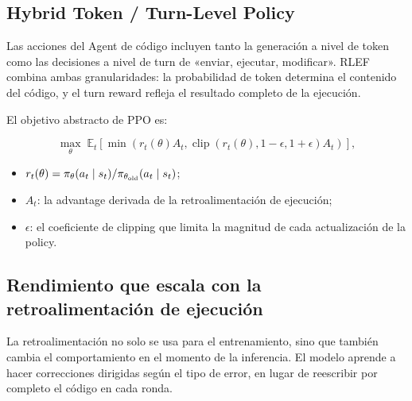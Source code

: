 \subsection{Hybrid Token / Turn-Level Policy}

Las acciones del Agent de código incluyen tanto la generación a nivel de token como las decisiones a nivel de turn de «enviar, ejecutar, modificar». RLEF combina ambas granularidades: la probabilidad de token determina el contenido del código, y el turn reward refleja el resultado completo de la ejecución.


El objetivo abstracto de PPO es:

$$
\max_\theta\;\mathbb E_t\left[
\min\left(r_t(\theta)A_t,
\operatorname{clip}(r_t(\theta),1-\epsilon,1+\epsilon)A_t\right)
\right],
$$

\begin{itemize}
    \item $r_t(\theta)=\pi_\theta(a_t\mid s_t)/\pi_{\theta_{\rm old}}(a_t\mid s_t)$;
    \item $A_t$: la advantage derivada de la retroalimentación de ejecución;
    \item $\epsilon$: el coeficiente de clipping que limita la magnitud de cada actualización de la policy.
\end{itemize}

\subsection{Rendimiento que escala con la retroalimentación de ejecución}


La retroalimentación no solo se usa para el entrenamiento, sino que también cambia el comportamiento en el momento de la inferencia. El modelo aprende a hacer correcciones dirigidas según el tipo de error, en lugar de reescribir por completo el código en cada ronda.




